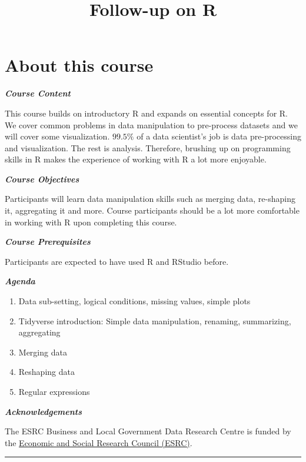 \documentclass[]{article}
\title{Follow-up on R}
\author{}
\date{}
\providecommand{\tightlist}{%
  \setlength{\itemsep}{0pt}\setlength{\parskip}{0pt}}
\begin{document}
\maketitle

{
\setcounter{tocdepth}{2}
\tableofcontents
}
\hypertarget{about-this-course}{%
\section*{About this course}\label{about-this-course}}

\textbf{\emph{Course Content}}

This course builds on introductory R and expands on essential concepts for R. We cover common problems in data manipulation to pre-process datasets and we will cover some visualization. \(99.5\%\) of a data scientist's job is data pre-processing and visualization. The rest is analysis. Therefore, brushing up on programming skills in R makes the experience of working with R a lot more enjoyable.

\textbf{\emph{Course Objectives}}

Participants will learn data manipulation skills such as merging data, re-shaping it, aggregating it and more. Course participants should be a lot more comfortable in working with R upon completing this course.

\textbf{\emph{Course Prerequisites}}

Participants are expected to have used R and RStudio before.

\textbf{\emph{Agenda}}

\begin{enumerate}
\def\labelenumi{\arabic{enumi}.}
\tightlist
\item
  Data sub-setting, logical conditions, missing values, simple plots
\item
  Tidyverse introduction: Simple data manipulation, renaming, summarizing, aggregating
\item
  Merging data
\item
  Reshaping data
\item
  Regular expressions
\end{enumerate}

\textbf{\emph{Acknowledgements}}

The ESRC Business and Local Government Data Research Centre is funded by the \href{https://esrc.ukri.org}{Economic and Social Research Council (ESRC)}.

\begin{center}\rule{0.5\linewidth}{\linethickness}\end{center}
\end{document}

